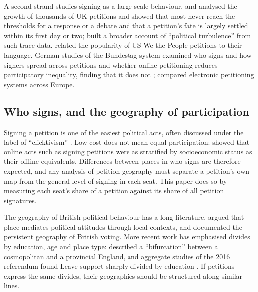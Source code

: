 \documentclass[11pt,a4paper]{article}
\begin{document}
A second strand studies signing as a large-scale behaviour. \citet{hale2013} and \citet{yasseri2017} analysed the growth of thousands of UK petitions and showed that most never reach the thresholds for a response or a debate and that a petition's fate is largely settled within its first day or two; \citet{margetts2016} built a broader account of ``political turbulence'' from such trace data. \citet{hagen2016} related the popularity of US We the People petitions to their language. German studies of the Bundestag system examined who signs and how signers spread across petitions \citep{jungherr2010,puschmann2017} and whether online petitioning reduces participatory inequality, finding that it does not \citep{escher2017}; \citet{riehm2014} compared electronic petitioning systems across Europe.

\subsection{Who signs, and the geography of participation}
Signing a petition is one of the easiest political acts, often discussed under the label of ``clicktivism'' \citep{halupka2014}. Low cost does not mean equal participation: \citet{schlozman2010} showed that online acts such as signing petitions were as stratified by socioeconomic status as their offline equivalents. Differences between places in who signs are therefore expected, and any analysis of petition geography must separate a petition's own map from the general level of signing in each seat. This paper does so by measuring each seat's share of a petition against its share of all petition signatures.

The geography of British political behaviour has a long literature. \citet{agnew1987} argued that place mediates political attitudes through local contexts, and \citet{johnstonpattie2006} documented the persistent geography of British voting. More recent work has emphasised divides by education, age and place type: \citet{jenningsstoker2016} described a ``bifurcation'' between a cosmopolitan and a provincial England, and aggregate studies of the 2016 referendum found Leave support sharply divided by education \citep{goodwinheath2016,beckeretal2017}. If petitions express the same divides, their geographies should be structured along similar lines.
\end{document}
